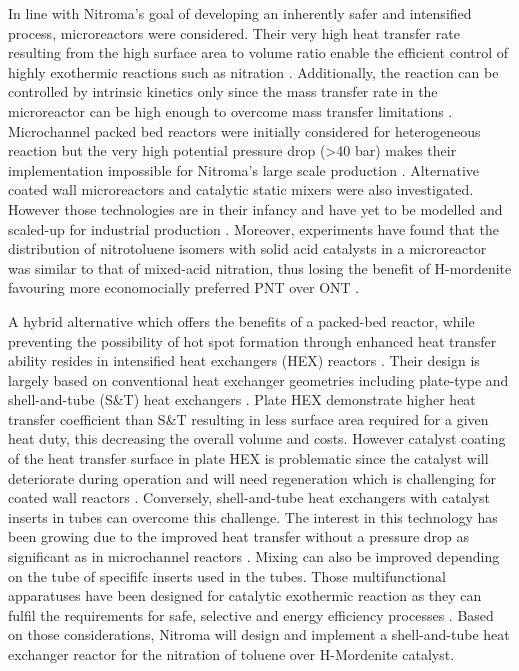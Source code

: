 In line with Nitroma's goal of developing an inherently safer and intensified process, microreactors were considered. Their very high heat transfer rate resulting from the high surface area to volume ratio enable the efficient control of highly exothermic reactions such as nitration \cite{halder_nitration_2007}. Additionally, the reaction can be controlled by intrinsic kinetics only since the mass transfer rate in the microreactor can be high enough to overcome mass transfer limitations \cite{halder_nitration_2007}. Microchannel packed bed reactors were initially considered for heterogeneous reaction but the very high potential pressure drop (>40 bar) makes their implementation impossible for Nitroma's large scale production \cite{rebrov_microreactors_2016}. Alternative coated wall microreactors and catalytic static mixers were also investigated. However those technologies are in their infancy and have yet to be modelled and scaled-up for industrial production \cite{lopes_regime_2013}. Moreover, experiments have found that the distribution of nitrotoluene isomers with solid acid catalysts in a microreactor was similar to that of mixed-acid nitration, thus losing the benefit of H-mordenite favouring more economocially preferred PNT over ONT \cite{halder_nitration_2007}.


A hybrid alternative which offers the benefits of a packed-bed reactor, while preventing the possibility of hot spot formation through enhanced heat transfer ability resides in intensified  heat exchangers (HEX) reactors \cite{di_miceli_raimondi_safety_2015}. Their design is largely based on conventional heat exchanger geometries including plate-type and shell-and-tube (S\&T) heat exchangers \cite{anxionnaz_heat_2008}. Plate HEX demonstrate higher heat transfer coefficient than S\&T resulting in less surface area required for a given heat duty, this decreasing the overall volume and costs. However catalyst coating of the heat transfer surface in plate HEX is problematic since the catalyst will deteriorate during operation and will need regeneration which is challenging for coated wall reactors \cite{anxionnaz_heat_2008}. Conversely, shell-and-tube heat exchangers with catalyst inserts in tubes can overcome this challenge. The interest in this technology has been growing due to the improved heat transfer without a pressure drop as significant as in microchannel reactors \cite{griffin_heat_2001}. Mixing can also be improved depending on the tube of specififc inserts used in the tubes. Those multifunctional apparatuses have been designed for catalytic exothermic reaction as they can fulfil the requirements for safe, selective and energy efficiency processes \cite{anxionnaz_heat_2008}. Based on those considerations, Nitroma will design and implement a shell-and-tube heat exchanger reactor for the nitration of toluene over H-Mordenite catalyst.



